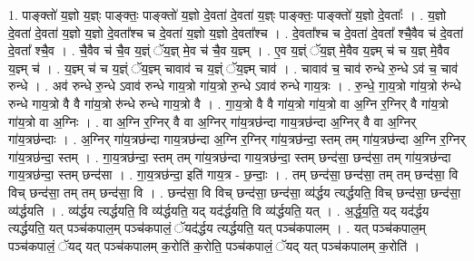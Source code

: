 \documentclass[17pt]{extarticle}
\begin{document}
1. पाङ्क्तो॑ य॒ज्ञो य॒ज्ञ्ः पाङ्क्तः॒ पाङ्क्तो॑ य॒ज्ञो दे॒वता॑ दे॒वता॑ य॒ज्ञ्ः पाङ्क्तः॒ पाङ्क्तो॑ य॒ज्ञो दे॒वताः᳚ । . य॒ज्ञो दे॒वता॑ दे॒वता॑ य॒ज्ञो य॒ज्ञो दे॒वता᳚श्च च दे॒वता॑ य॒ज्ञो य॒ज्ञो दे॒वता᳚श्च । . दे॒वता᳚श्च च दे॒वता॑ दे॒वता᳚ श्चै॒वैव च॑ दे॒वता॑ दे॒वता᳚ श्चै॒व । . चै॒वैव च॑ चै॒व य॒ज्ञ्ं ॅय॒ज्ञ् मे॒व च॑ चै॒व य॒ज्ञ्म् । . ए॒व य॒ज्ञ्ं ॅय॒ज्ञ् मे॒वैव य॒ज्ञ्म् च॑ च य॒ज्ञ् मे॒वैव य॒ज्ञ्म् च॑ । . य॒ज्ञ्म् च॑ च य॒ज्ञ्ं ॅय॒ज्ञ्म् चावाव॑ च य॒ज्ञ्ं ॅय॒ज्ञ्म् चाव॑ । . चावाव॑ च॒ चाव॑ रुन्धे रु॒न्धे ऽव॑ च॒ चाव॑ रुन्धे । . अव॑ रुन्धे रु॒न्धे ऽवाव॑ रुन्धे गाय॒त्रो गा॑य॒त्रो रु॒न्धे ऽवाव॑ रुन्धे गाय॒त्रः । . रु॒न्धे॒ गा॒य॒त्रो गा॑य॒त्रो रु॑न्धे रुन्धे गाय॒त्रो वै वै गा॑य॒त्रो रु॑न्धे रुन्धे गाय॒त्रो वै । . गा॒य॒त्रो वै वै गा॑य॒त्रो गा॑य॒त्रो वा अ॒ग्नि र॒ग्निर् वै गा॑य॒त्रो गा॑य॒त्रो वा अ॒ग्निः । . वा अ॒ग्नि र॒ग्निर् वै वा अ॒ग्निर् गा॑य॒त्रछ॑न्दा गाय॒त्रछ॑न्दा अ॒ग्निर् वै वा अ॒ग्निर् गा॑य॒त्रछ॑न्दाः । . अ॒ग्निर् गा॑य॒त्रछ॑न्दा गाय॒त्रछ॑न्दा अ॒ग्नि र॒ग्निर् गा॑य॒त्रछ॑न्दा॒ स्तम् तम् गा॑य॒त्रछ॑न्दा अ॒ग्नि र॒ग्निर् गा॑य॒त्रछ॑न्दा॒ स्तम् । . गा॒य॒त्रछ॑न्दा॒ स्तम् तम् गा॑य॒त्रछ॑न्दा गाय॒त्रछ॑न्दा॒ स्तम् छन्द॑सा॒ छन्द॑सा॒ तम् गा॑य॒त्रछ॑न्दा गाय॒त्रछ॑न्दा॒ स्तम् छन्द॑सा । . गा॒य॒त्रछ॑न्दा॒ इति॑ गाय॒त्र - छ॒न्दाः॒ । . तम् छन्द॑सा॒ छन्द॑सा॒ तम् तम् छन्द॑सा॒ वि विच् छन्द॑सा॒ तम् तम् छन्द॑सा॒ वि । . छन्द॑सा॒ वि विच् छन्द॑सा॒ छन्द॑सा॒ व्य॑र्द्धय त्यर्द्धयति॒ विच् छन्द॑सा॒ छन्द॑सा॒ व्य॑र्द्धयति । . व्य॑र्द्धय त्यर्द्धयति॒ वि व्य॑र्द्धयति॒ यद् यद॑र्द्धयति॒ वि व्य॑र्द्धयति॒ यत् । . अ॒र्द्ध॒य॒ति॒ यद् यद॑र्द्धय त्यर्द्धयति॒ यत् पञ्च॑कपाल॒म् पञ्च॑कपालं॒ ॅयद॑र्द्धय त्यर्द्धयति॒ यत् पञ्च॑कपालम् । . यत् पञ्च॑कपाल॒म् पञ्च॑कपालं॒ ॅयद् यत् पञ्च॑कपालम् क॒रोति॑ क॒रोति॒ पञ्च॑कपालं॒ ॅयद् यत् पञ्च॑कपालम् क॒रोति॑ । \newline
\end{document}
